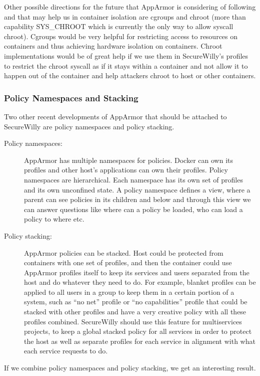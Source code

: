 Other possible directions for the future that AppArmor is considering of following and that may help us in container isolation are cgroups and chroot (more than capability SYS\_CHROOT which is currently the only way to allow syscall chroot). Cgroups would be very helpful for restricting access to resources on containers and thus achieving hardware isolation on containers. Chroot implementations would be of great help if we use them in SecureWilly's profiles to restrict the chroot syscall as if it stays within a container and not allow it to happen out of the container and help attackers chroot to host or other containers.

\subsubsection{Policy Namespaces and Stacking}
Two other recent developments of AppArmor that should be attached to SecureWilly are policy namespaces and policy stacking. \cite{app3suse}
\begin{description}
\item[Policy namespaces:] AppArmor has multiple namespaces for policies. Docker can own its profiles and other host's applications can own their profiles. Policy namespaces are hierarchical.  Each namespace has its own set of profiles and its own unconfined state. A policy namespace defines a view, where a parent can see policies in its children and below and through this view we can answer questions like where can a policy be loaded, who can load a policy to where etc. 

\item[Policy stacking:] AppArmor policies can be stacked. Host could be protected from containers with one set of profiles, and then the container could use AppArmor profiles itself to keep its services and users separated from the host and do whatever they need to do. For example, blanket profiles can be applied to all users in a group to keep them in a certain portion of a system, such as “no net” profile or “no capabilities” profile that could be stacked with other profiles and have a very creative policy with all these profiles combined. SecureWilly should use this feature for multiservices projects, to keep a global stacked policy for all services in order to protect the host as well as separate profiles for each service in alignment with what each service requests to do.
\end{description}

If we combine policy namespaces and policy stacking, we get an interesting result.

